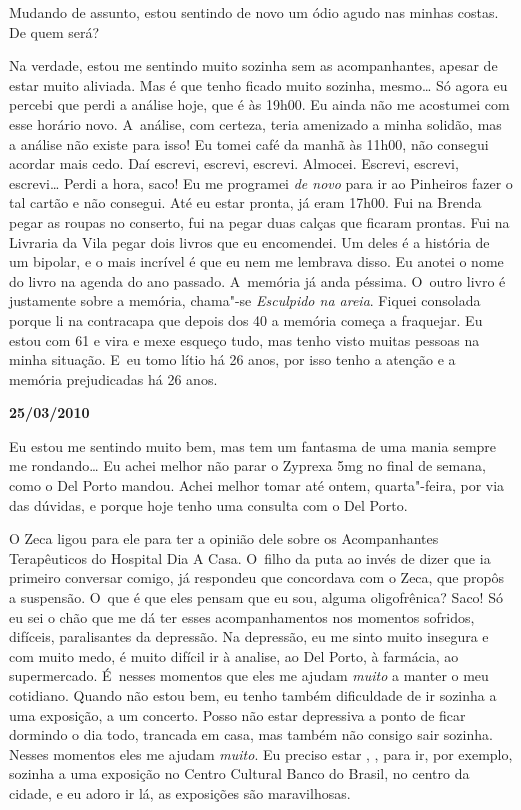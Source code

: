 Mudando de assunto, estou sentindo de novo um ódio agudo nas minhas
costas. De quem será?

Na verdade, estou me sentindo muito sozinha sem as acompanhantes, apesar
de estar muito aliviada. Mas é que tenho ficado muito sozinha,
mesmo… Só agora eu percebi que perdi a análise hoje, que é às
19h00. Eu ainda não me acostumei com esse horário novo. A~análise, com
certeza, teria amenizado a minha solidão, mas a análise não existe para
isso! Eu tomei café da manhã às 11h00, não consegui acordar mais cedo.
Daí escrevi, escrevi, escrevi. Almocei. Escrevi, escrevi,
escrevi… Perdi a hora, saco! Eu me programei \emph{de novo} para
ir ao Pinheiros fazer o tal cartão e não consegui. Até eu estar pronta,
já eram 17h00. Fui na Brenda pegar as roupas no conserto, fui na 
pegar duas calças que ficaram prontas. Fui na Livraria da Vila pegar
dois livros que eu encomendei. Um deles é a história de um bipolar, e o
mais incrível é que eu nem me lembrava disso. Eu anotei o nome do livro na
agenda do ano passado. A~memória já anda péssima. O~outro livro é
justamente sobre a memória, chama"-se \emph{Esculpido na areia}. Fiquei
consolada porque li na contracapa que depois dos 40 a memória começa a
fraquejar. Eu estou com 61 e vira e mexe esqueço tudo, mas tenho visto
muitas pessoas na minha situação. E~eu tomo lítio há 26 anos, por
isso tenho a atenção e a memória prejudicadas há 26 anos.

\begin{center}\textbf{\asterisc{}}\end{center}


\begin{flushright}\textbf{25/03/2010}\end{flushright}


Eu estou me sentindo muito bem, mas tem um fantasma de uma mania
sempre me rondando… Eu achei melhor não parar o Zyprexa 5mg no
final de semana, como o Del Porto mandou. Achei melhor tomar até ontem,
quarta"-feira, por via das dúvidas, e porque hoje tenho uma consulta com
o Del Porto.

O Zeca ligou para ele para ter a opinião dele sobre os Acompanhantes
Terapêuticos do Hospital Dia A Casa. O~filho da puta ao invés de dizer
que ia primeiro conversar comigo, já respondeu que concordava com o
Zeca, que propôs a suspensão. O~que é que eles pensam que eu sou, alguma
oligofrênica? Saco! Só eu sei o chão que me dá ter esses
acompanhamentos nos momentos sofridos, difíceis, paralisantes da
depressão. Na depressão, eu me sinto muito insegura e com muito medo, é
muito difícil ir à analise, ao Del Porto, à farmácia, ao supermercado. É~nesses momentos que eles me ajudam \emph{muito} a manter o meu
cotidiano. Quando não estou bem, eu tenho também dificuldade de ir
sozinha a uma exposição, a um concerto. Posso não estar depressiva a
ponto de ficar dormindo o dia todo, trancada em casa, mas também não
consigo sair sozinha. Nesses momentos eles me ajudam \emph{muito}. Eu
preciso estar , ,  para ir, por exemplo, sozinha a uma
exposição no Centro Cultural Banco do Brasil, no centro da cidade, e eu
adoro ir lá, as exposições são maravilhosas.


